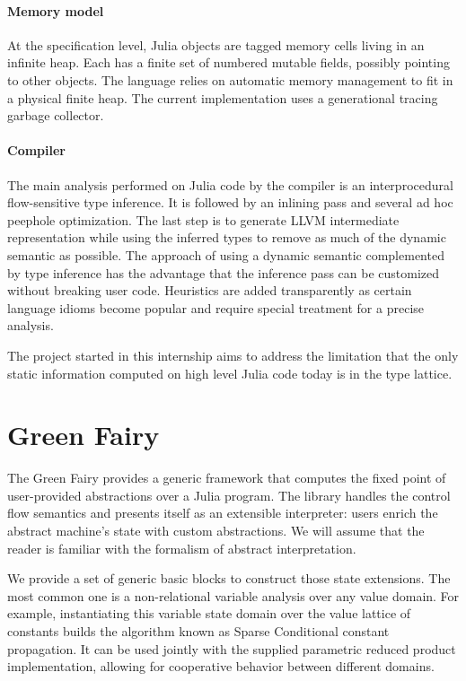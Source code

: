 \documentclass[11pt]{article}
\begin{document}
\paragraph{Memory model} At the specification level, Julia objects are tagged memory cells living in an infinite heap. Each has a finite set of numbered mutable fields, possibly pointing to other objects. The language relies on automatic memory management to fit in a physical finite heap.
The current implementation uses a generational tracing garbage collector. %

\paragraph{Compiler} The main analysis performed on Julia code by the compiler is an interprocedural flow-sensitive type inference. It is followed by an inlining pass and several ad hoc peephole optimization. The last step is to generate LLVM intermediate representation while using the inferred types to remove as much of the dynamic semantic as possible.
The approach of using a dynamic semantic complemented by type inference has the advantage that the inference pass can be customized without breaking user code.
Heuristics are added transparently as certain language idioms become popular and require special treatment for a precise analysis.

The project started in this internship aims to address the limitation that the only static information computed on high level Julia code today is in the type lattice.

\section*{Green Fairy}

The Green Fairy provides a generic framework that computes the fixed point of user-provided abstractions over a Julia program.
The library handles the control flow semantics and presents itself as an extensible interpreter: users enrich the abstract machine's state with custom abstractions.
We will assume that the reader is familiar with the formalism of abstract interpretation\cite{absint-cousot}.

We provide a set of generic basic blocks to construct those state extensions.
The most common one is a non-relational variable analysis over any value domain.
For example, instantiating this variable state domain over the value lattice of constants builds the algorithm known as Sparse Conditional constant propagation\cite{sparsecp}.
It can be used jointly with the supplied parametric reduced product\cite{redprod} implementation, allowing for cooperative behavior between different domains.
\end{document}
